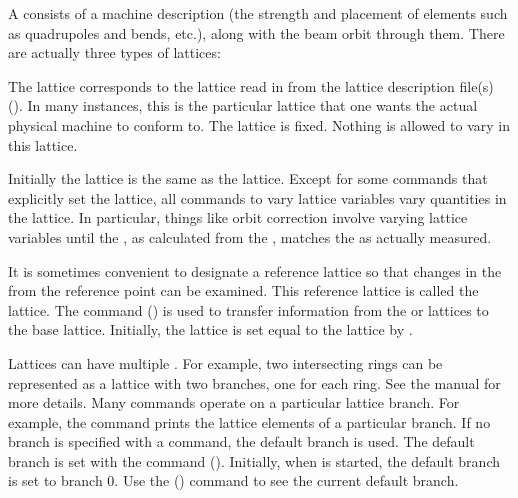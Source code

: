A  consists of a machine description (the strength and placement of elements such as
quadrupoles and bends, etc.), along with the beam orbit through them. There are actually three types
of lattices:
  \vspace*{-3ex}
  \begin{description}
  \item[Design Lattice] \Newline 
The  lattice corresponds to the lattice read in from the lattice description file(s)
(). In many instances, this is the particular lattice that one wants the actual
physical machine to conform to. The  lattice is fixed. Nothing is allowed to vary in this
lattice.
  \item[Model Lattice] \Newline
Initially the  lattice is the same as the  lattice. Except for some commands
that explicitly set the  lattice, all \tao commands to vary lattice variables vary
quantities in the  lattice. In particular, things like orbit correction involve varying
 lattice variables until the , as calculated from the , matches the
 as actually measured.
  \item[Base Lattice] \Newline
It is sometimes convenient to designate a reference lattice so that changes in the  from
the reference point can be examined.  This reference lattice is called the  lattice. The
 command () is used to transfer information from the  or 
lattices to the base lattice. Initially, the  lattice is set equal to the 
lattice by \tao.
  \end{description}

Lattices can have multiple . For example, two intersecting rings can be represented as
a lattice with two branches, one for each ring. See the \bmad manual for more details. Many \tao
commands operate on a particular lattice branch. For example, the  command prints the
lattice elements of a particular branch. If no branch is specified with a command, the default
branch is used. The default branch is set with the  command
(). Initially, when \tao is started, the default branch is set to branch 0. Use the
 () command to see the current default branch.

